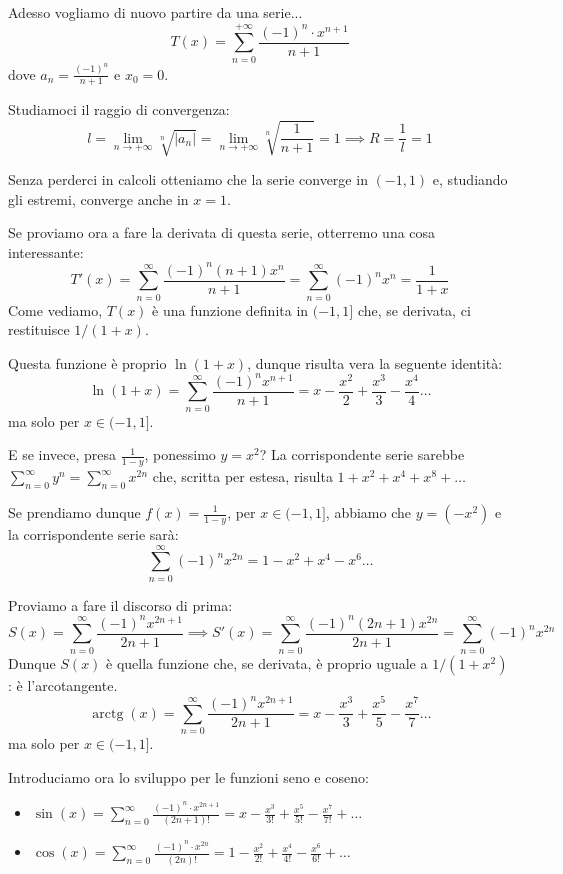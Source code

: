 \documentclass[12pt]{report}
\begin{document}
	Adesso vogliamo di nuovo partire da una serie...
	\[
	T(x) = \sum_{n=0}^{+\infty} \frac{(-1)^n \cdot x^{n+1}}{n+1}
	\]
	dove $a_n = \frac{(-1)^n}{n+1}$ e $x_0 = 0$.
	
	Studiamoci il raggio di convergenza:
	\[
	l = \lim_{n \to +\infty} \sqrt[n]{|a_n|} = \lim_{n \to +\infty} \sqrt[n]{\frac{1}{n+1}} = 1 \implies R = \frac{1}{l} = 1
	\]
	
	Senza perderci in calcoli otteniamo che la serie converge in $(-1, 1)$ e, studiando gli estremi, converge anche in $x = 1$.
	
	Se proviamo ora a fare la derivata di questa serie, otterremo una cosa interessante:
	\[
	T'(x) = \sum_{n=0}^{\infty} \frac{(-1)^n (n+1) x^n}{n+1} = \sum_{n=0}^{\infty} (-1)^n x^n = \frac{1}{1+x}
	\]
	Come vediamo, $T(x)$ è una funzione definita in $(-1, 1]$ che, se derivata, ci restituisce $1 / (1+x)$.
	
	Questa funzione è proprio $\ln(1+x)$, dunque risulta vera la seguente identità:
	\[
	\ln(1+x) = \sum_{n=0}^{\infty} \frac{(-1)^n x^{n+1}}{n+1} = x - \frac{x^2}{2} + \frac{x^3}{3} - \frac{x^4}{4} \dots
	\]
	ma solo per $x \in (-1, 1]$.
	
	E se invece, presa $\frac{1}{1-y}$, ponessimo $y = x^2$?
	La corrispondente serie sarebbe $\sum_{n=0}^{\infty} y^n = \sum_{n=0}^{\infty} x^{2n}$ che, scritta per estesa, risulta $1 + x^2 + x^4 + x^8 + \dots$
	
	Se prendiamo dunque $f(x) = \frac{1}{1-y}$, per $x \in (-1, 1]$, abbiamo che $y = (-x^2)$ e la corrispondente serie sarà:
	\[
	\sum_{n=0}^{\infty} (-1)^n x^{2n} = 1 - x^2 + x^4 - x^6 \dots
	\]
	
	Proviamo a fare il discorso di prima:
	\[
	S(x) = \sum_{n=0}^{\infty} \frac{(-1)^n x^{2n+1}}{2n+1} \implies S'(x) = \sum_{n=0}^{\infty} \frac{(-1)^n (2n+1) x^{2n}}{2n+1} = \sum_{n=0}^{\infty} (-1)^n x^{2n}
	\]
	Dunque $S(x)$ è quella funzione che, se derivata, è proprio uguale a $1 / (1+x^2)$: è l'arcotangente.
	\[
	\operatorname{arctg}(x) = \sum_{n=0}^{\infty} \frac{(-1)^n x^{2n+1}}{2n+1} = x - \frac{x^3}{3} + \frac{x^5}{5} - \frac{x^7}{7} \dots
	\]
	ma solo per $x \in (-1, 1]$.
	
	Introduciamo ora lo sviluppo per le funzioni seno e coseno:
	\begin{itemize}
		
		\item $\sin(x) = \sum_{n=0}^{\infty} \frac{(-1)^n \cdot x^{2n+1}}{(2n+1)!} = x - \frac{x^3}{3!} + \frac{x^5}{5!} - \frac{x^7}{7!} + \dots$
		
		\item $\cos(x) = \sum_{n=0}^{\infty} \frac{(-1)^n \cdot x^{2n}}{(2n)!} = 1 - \frac{x^2}{2!} + \frac{x^4}{4!} - \frac{x^6}{6!} + \dots$
		
	\end{itemize}
	
\end{document}
